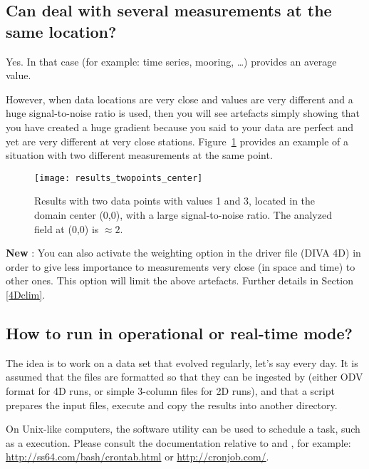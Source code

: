 \subsection{Can \diva deal with several measurements at the same location?}

Yes. In that case (for example: time series, mooring, \ldots) \diva provides an average value. 

However, when data locations are very close and values are very different and a huge signal-to-noise ratio is used, then you will see artefacts simply showing that you have created a huge gradient because you said to \diva your data are perfect and yet are very different at very close stations. Figure~\ref{fig:results_twopoints_center} provides an example of a situation with two different measurements at the same point.

\begin{figure}[H]
\centering 
\texttt{[image: results\_twopoints\_center]}
\caption[Results with two data points with values 1 and 3, located in the domain center (0,0), with a large signal-to-noise ratio.]{Results with two data points with values 1 and 3, located in the domain center (0,0), with a large signal-to-noise ratio. The analyzed field at (0,0) is $\approx 2$.\label{fig:results_twopoints_center}}
\end{figure}

\textbf{New} :
You can also activate the weighting option in the driver file (DIVA 4D)
in order to give less importance to measurements very close (in space and time) to other ones. This option will limit 
the above artefacts. 
Further details in Section \ref{4Dclim}.

\subsection{How to run \diva in operational or real-time mode?}

The idea is to work on a data set that evolved regularly, let's say every day. It is assumed that the files are formatted so that they can be ingested by \diva (either ODV format for 4D runs, or simple 3-column files for 2D runs), and that a script  prepares the input files, execute \diva and copy the results into another directory.

On Unix-like computers, the software utility  can be used to schedule a task, such as a \diva execution. Please consult the documentation relative to  and , for example: 
\url{http://ss64.com/bash/crontab.html} or \url{http://cronjob.com/}.

